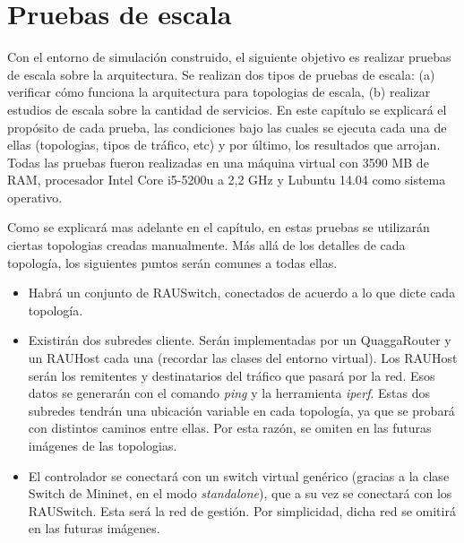 \chapter{Pruebas de escala}
Con el entorno de simulación construido, el siguiente objetivo es realizar pruebas de escala sobre la arquitectura. Se realizan dos tipos de pruebas de escala: (a) verificar cómo funciona la arquitectura para topologias de escala, (b) realizar estudios de escala sobre la cantidad de servicios. En este capítulo se explicará el propósito de cada prueba, las condiciones bajo las cuales se ejecuta cada una de ellas (topologias, tipos de tráfico, etc) y por último, los resultados que arrojan. Todas las pruebas fueron realizadas en una máquina virtual con 3590 MB de RAM, procesador Intel Core i5-5200u a 2,2 GHz y Lubuntu 14.04 como sistema operativo.

Como se explicará mas adelante en el capítulo, en estas pruebas se utilizarán ciertas topologias creadas manualmente. Más allá de los detalles de cada topología, los siguientes puntos serán comunes a todas ellas.
\begin{itemize}
	\item Habrá un conjunto de RAUSwitch, conectados de acuerdo a lo que dicte cada topología.
	\item Existirán dos subredes cliente. Serán implementadas por un QuaggaRouter y un RAUHost cada una (recordar las clases del entorno virtual). Los RAUHost serán los remitentes y destinatarios del tráfico que pasará por la red. Esos datos se generarán con el comando \textit{ping} y la herramienta \textit{iperf}. Estas dos subredes tendrán una ubicación variable en cada topología, ya que se probará con distintos caminos entre ellas. Por esta razón, se omiten en las futuras imágenes de las topologias.
	\item El controlador se conectará con un switch virtual genérico (gracias a la clase Switch de Mininet, en el modo \textit{standalone}), que a su vez se conectará con los RAUSwitch. Esta será la red de gestión. Por simplicidad, dicha red se omitirá en las futuras imágenes.
\end{itemize}

